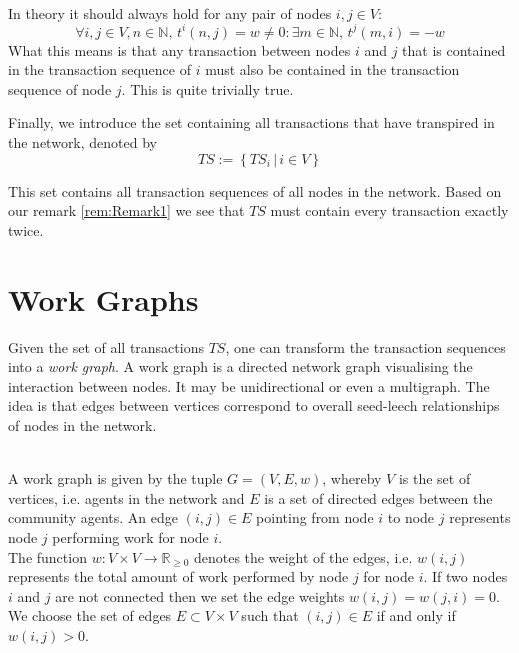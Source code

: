 \begin{remark}[]\ \\
\label{rem:Remark1}
In theory it should always hold for any pair of nodes $i,j\in{}V$:
\[
\forall{}i,j\in{}V,n\in\mathbb{N},\,t^i(n,j)=w\neq{}0:\exists{}m\in\mathbb{N},\,t^j(m,i)=-w
\]
\noindent{}What this means is that any transaction between nodes $i$ and $j$ that is contained in the transaction sequence of $i$ must also be contained in the transaction sequence of node $j$. This is quite trivially true. \vspace{1em}\\
\end{remark}

\noindent{}Finally, we introduce the set containing all transactions that have transpired in the network, denoted by 
\[
TS:=\left\lbrace{}TS_i\,|\,i\in{}V\right\rbrace
\]

\noindent{}This set contains all transaction sequences of all nodes in the network. Based on our remark \ref{rem:Remark1} we see that $TS$ must contain every transaction exactly twice.


\section{Work Graphs}
\label{sec:Work Graphs}
\noindent{}Given the set of all transactions $TS$, one can transform the transaction sequences into a {\it work graph}. A work graph is a directed network graph visualising the interaction between nodes. It may be unidirectional or even a multigraph. The idea is that edges between vertices correspond to overall seed-leech relationships of nodes in the network. \vspace{1em}\\

\begin{definition}\ \\
\label{def:Work Graph}
A work graph is given by the tuple $G = (V, E, w)$, whereby $V$ is the set of vertices, i.e. agents in the network and $E$ is a set of directed edges between the community agents. An edge $(i,j)\in{}E$ pointing from node $i$ to node $j$ represents node $j$ performing work for node $i$. \\ The function $w:V\times{}V\rightarrow{}\mathbb{R}_{\geq{}0}$ denotes the weight of the edges, i.e. $w(i,j)$ represents the total amount of work performed by node $j$ for node $i$. If two nodes $i$ and $j$ are not connected then we set the edge weights $w(i,j)=w(j,i)=0$. We choose the set of edges $E\subset{}V\times{}V$ such that $(i,j)\in{}E$ if and only if $w(i,j)>0$. \vspace{1em}\\ 
\end{definition}

